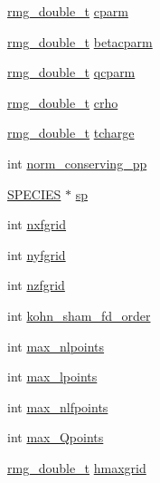 \begin{DoxyCompactItemize}
\hyperlink{rmgtypes_8h_aaa16921c14f121c56eaa42390a340db8}{rmg\-\_\-double\-\_\-t} \hyperlink{struct_c_o_n_t_r_o_l_a238f0f02ebbebb96bce7dbbc4be8b659}{cparm}
\item 
\hyperlink{rmgtypes_8h_aaa16921c14f121c56eaa42390a340db8}{rmg\-\_\-double\-\_\-t} \hyperlink{struct_c_o_n_t_r_o_l_ac105e71492817a9b5a45c62528f8ad02}{betacparm}
\item 
\hyperlink{rmgtypes_8h_aaa16921c14f121c56eaa42390a340db8}{rmg\-\_\-double\-\_\-t} \hyperlink{struct_c_o_n_t_r_o_l_a4df39c9293ee9fe328c9763edd3931e0}{qcparm}
\item 
\hyperlink{rmgtypes_8h_aaa16921c14f121c56eaa42390a340db8}{rmg\-\_\-double\-\_\-t} \hyperlink{struct_c_o_n_t_r_o_l_a4bc8f53253fc4773fd7c69b34efa9500}{crho}
\item 
\hyperlink{rmgtypes_8h_aaa16921c14f121c56eaa42390a340db8}{rmg\-\_\-double\-\_\-t} \hyperlink{struct_c_o_n_t_r_o_l_ae2a510739e4cb00666ccd23c536b541a}{tcharge}
\item 
int \hyperlink{struct_c_o_n_t_r_o_l_a4dcd2fa6ee85809b2063bec7bf12e0f9}{norm\-\_\-conserving\-\_\-pp}
\item 
\hyperlink{struct_s_p_e_c_i_e_s}{S\-P\-E\-C\-I\-E\-S} $\ast$ \hyperlink{struct_c_o_n_t_r_o_l_adc51da670b085b44e45b30153309c631}{sp}
\item 
int \hyperlink{struct_c_o_n_t_r_o_l_aad8590b63495ff2f7f247d1f492f3338}{nxfgrid}
\item 
int \hyperlink{struct_c_o_n_t_r_o_l_afaef01a3908b8c403adb4c5ffebbf867}{nyfgrid}
\item 
int \hyperlink{struct_c_o_n_t_r_o_l_afd4613ad1374a5414c5a4bc9c6ea05f4}{nzfgrid}
\item 
int \hyperlink{struct_c_o_n_t_r_o_l_a55724097020f20e54c4175619a801bc8}{kohn\-\_\-sham\-\_\-fd\-\_\-order}
\item 
int \hyperlink{struct_c_o_n_t_r_o_l_a307091121677af16b354f1a7f07e0b87}{max\-\_\-nlpoints}
\item 
int \hyperlink{struct_c_o_n_t_r_o_l_aec8eaf77ca605bbbeb7c4d276935a177}{max\-\_\-lpoints}
\item 
int \hyperlink{struct_c_o_n_t_r_o_l_aabd9c1a61dee57d65b241e9e5883f352}{max\-\_\-nlfpoints}
\item 
int \hyperlink{struct_c_o_n_t_r_o_l_a77a3d257a6a9c45b1064c6e5f2d29407}{max\-\_\-\-Qpoints}
\item 
\hyperlink{rmgtypes_8h_aaa16921c14f121c56eaa42390a340db8}{rmg\-\_\-double\-\_\-t} \hyperlink{struct_c_o_n_t_r_o_l_a5ecd08ae400c38e0b65c368e9148a444}{hmaxgrid}
\item 

\end{DoxyCompactItemize}
